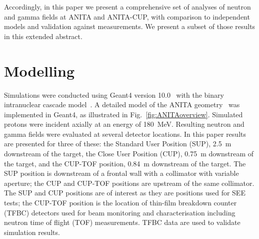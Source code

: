 \documentclass[peerreviewca,11pt,a4paper]{IEEEtran}
\begin{document}
Accordingly, in this paper we present a comprehensive set of analyses of neutron and gamma fields at ANITA and ANITA-CUP, with comparison to independent models and validation against measurements.
We present a subset of those results in this extended abstract.

\section{Modelling}
Simulations were conducted using Geant4 version 10.0~\cite{Agostinelli2003,Allison2006} with the binary intranuclear cascade model~\cite{Platt2013}.
A detailed model of the ANITA geometry~\cite{Prokofiev2009,Prokofiev2014} was implemented in Geant4, as illustrated in Fig.~\ref{fig:ANITAoverview}.
Simulated protons were incident axially at an energy of \SI{180}{\MeV}.
Resulting neutron and gamma fields were evaluated at several detector locations.
In this paper results are presented for three of these: the Standard User Position (SUP), \SI{2.5}{\m} downstream of the target, the Close User Position (CUP), \SI{0.75}{\m} downstream of the target, and the CUP-TOF position, \SI{0.84}{m} downstream of the target.
The SUP position is downstream of a frontal wall with a collimator with variable aperture; the CUP and CUP-TOF positions are upstream of the same collimator.
The SUP and CUP positions are of interest as they are positions used for SEE tests; the CUP-TOF position is the location of thin-film breakdown counter (TFBC) detectors used for beam monitoring and characterisation including neutron time of flight (TOF) measurements.
TFBC data are used to validate simulation results.
\end{document}
